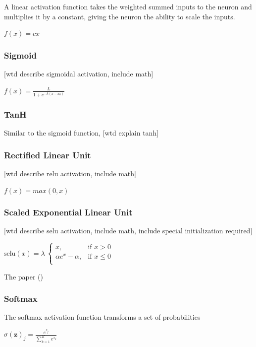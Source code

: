 A linear activation function takes the weighted summed inputs to the neuron and multiplies it by a constant, giving the neuron the ability to scale the inputs.

{\centering
  $f(x)=cx$\par
}


\subsubsection{Sigmoid}
[wtd describe sigmoidal activation, include math]

{\centering
	$\displaystyle f(x)={\frac {L}{1+e^{-k(x-x_{0})}}}$\par
}

\subsubsection{TanH}

Similar to the sigmoid function, [wtd explain tanh]

\subsubsection{Rectified Linear Unit}
[wtd describe relu activation, include math]

{\centering
	$f(x)=max(0, x)$\par
}

\subsubsection{Scaled Exponential Linear Unit}
[wtd describe selu activation, include math, include special initialization required]


{\centering
	$\text{selu}(x) = \lambda\ \begin{cases}
    x,& \text{if } x > 0\\
    \alpha e^{x} - \alpha,& \text{if } x\leq 0\\
	\end{cases}$
	\par
}


The paper (\cite{DBLP:journals/corr/KlambauerUMH17})


\subsubsection{Softmax}
The softmax activation function transforms a set of probabilities

{\centering
	$\sigma (\mathbf {z} )_{j}={\frac {e^{z_{j}}}{\sum _{k=1}^{K}e^{z_{k}}}}$
	\par
}

